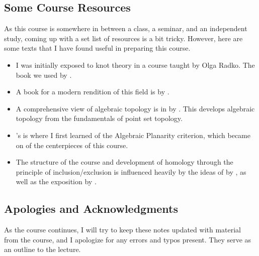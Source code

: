 \subsection{Some Course Resources}
As this course is somewhere in between a class, a seminar, and an independent study, coming up with a set list of resources is a bit tricky. However, here are some texts that I have found useful in preparing this course. 
\begin{itemize}
	\item I was initially exposed to knot theory in a course taught by Olga Radko. The book we used  by \citeauthor{farmer1995knots}. 
	\item A book for a modern rendition of this field is  by  \citeauthor{kozlov2007combinatorial}. 
	\item A comprehensive view of algebraic topology is in  by \citeauthor{hatcher2002algebraic}. This develops algebraic topology from the fundamentals of point set topology. 
	\item \citeauthor{diestel2000graph}'s  is where I first learned of the Algebraic Planarity criterion, which became on of the centerpieces of this course. 
	\item The structure of the course and development of homology through the principle of inclusion/exclusion is influenced heavily by the ideas of  by \citeauthor{khovanov1999categorification}, as well as the exposition  by \citeauthor{bar2002khovanov}. 
\end{itemize}
\subsection{Apologies and Acknowledgments}
As the course continues, I will try to keep these notes updated with material from the course, and I apologize for any errors and typos present. They serve as an outline to the lecture.\\

